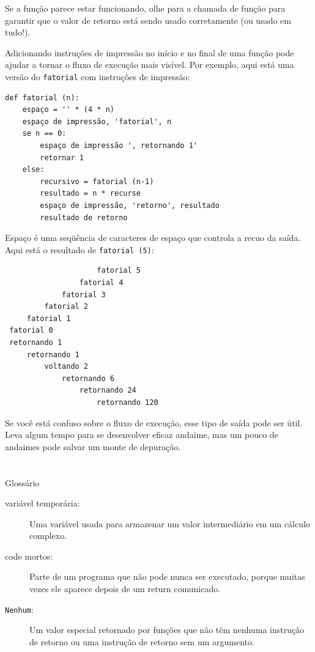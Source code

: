 \documentclass[10pt]{book}
\begin{document}
\begin{exercise}
{{Se a função parece estar funcionando, olhe para a chamada de função
para garantir que o valor de retorno está sendo usado corretamente (ou usado
em tudo!).

Adicionando instruções de impressão no início e no final de uma função
pode ajudar a tornar o fluxo de execução mais visível.
Por exemplo, aqui está uma versão do {\tt fatorial} com
instruções de impressão:

\begin{verbatim}
def fatorial (n):
    espaço = '' * (4 * n)
    espaço de impressão, 'fatorial', n
    se n == 0:
        espaço de impressão ', retornando 1'
        retornar 1
    else:
        recursivo = fatorial (n-1)
        resultado = n * recurse
        espaço de impressão, 'retorno', resultado
        resultado de retorno
\end{verbatim}
%
{Espaço \tt} é uma seqüência de caracteres de espaço que controla a
recuo da saída. Aqui está o resultado de {\tt fatorial (5)}:

\begin{verbatim}
                     fatorial 5
                 fatorial 4
             fatorial 3
         fatorial 2
     fatorial 1
 fatorial 0
 retornando 1
     retornando 1
         voltando 2
             retornando 6
                 retornando 24
                     retornando 120
\end{verbatim}
%
Se você está confuso sobre o fluxo de execução, esse tipo de
saída pode ser útil. Leva algum tempo para se desenvolver eficaz
andaime, mas um pouco de andaimes pode salvar um monte de depuração.


\section{} Glossário

\begin{description}

\item[variável temporária:] Uma variável usada para armazenar um valor intermediário em
um cálculo complexo.

\item[code mortos:] Parte de um programa que não pode nunca ser executado, porque muitas vezes
ele aparece depois de um {return \tt} comunicado.

\item[{\tt Nenhum}:] Um valor especial retornado por funções que
não têm nenhuma instrução de retorno ou uma instrução de retorno sem um argumento.


\end{description}}}
\end{exercise}
\end{document}
